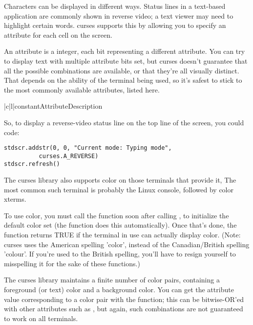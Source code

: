 \documentclass{howto}
\begin{document}
Characters can be displayed in different ways.  Status lines in a
text-based application are commonly shown in reverse video; a text
viewer may need to highlight certain words.  curses supports this by
allowing you to specify an attribute for each cell on the screen.

An attribute is a integer, each bit representing a different
attribute.  You can try to display text with multiple attribute bits
set, but curses doesn't guarantee that all the possible combinations
are available, or that they're all visually distinct.  That depends on
the ability of the terminal being used, so it's safest to stick to the
most commonly available attributes, listed here.

\begin{tableii}{|c|l|}{constant}{Attribute}{Description}
\end{tableii}

So, to display a reverse-video status line on the top line of the
screen,
you could code:

\begin{verbatim}
stdscr.addstr(0, 0, "Current mode: Typing mode",
	      curses.A_REVERSE)
stdscr.refresh()
\end{verbatim}

The curses library also supports color on those terminals that
provide it, The most common such terminal is probably the Linux
console, followed by color xterms.

To use color, you must call the  function soon
after calling , to initialize the default color
set (the  function does this
automatically).  Once that's done, the 
function returns TRUE if the terminal in use can actually display
color.  (Note: curses uses the American spelling 'color', instead of
the Canadian/British spelling 'colour'.  If you're used to the British
spelling, you'll have to resign yourself to misspelling it for the
sake of these functions.)

The curses library maintains a finite number of color pairs,
containing a foreground (or text) color and a background color.  You
can get the attribute value corresponding to a color pair with the
 function; this can be bitwise-OR'ed with other
attributes such as , but again, such combinations
are not guaranteed to work on all terminals.
\end{document}

